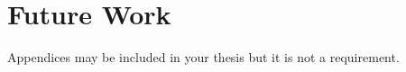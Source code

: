 \documentclass[a4paper]{article}
\begin{document}
\lipsum[4]

\lipsum[3]

\section{Future Work}
\label{sec:futwork}

\lipsum[10]

\newpage

\medskip

%
%

\clearpage
\newpage
\begin{appendices}

{Appendices may be included in your thesis but it is not a requirement.}

\end{appendices}
\end{document}

